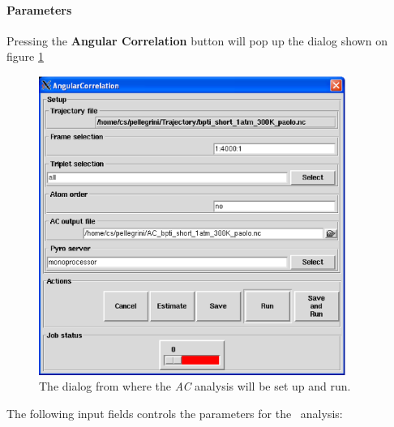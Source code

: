 \documentclass[a4paper,11pt]{report}
\begin{document}
\paragraph{Parameters\\}
\label{ac_parameters}
Pressing the \textbf{Angular Correlation} button will pop up the dialog shown on figure \ref{fig:ac}
\begin{figure}[h!]
\begin{center}
\includegraphics[width=10cm]{Figures/ac.eps}
\end{center}
\caption[The \textit{AC} analysis dialog]{The dialog from where the \textit{AC} analysis will be set up and run.}
\label{fig:ac}
\end{figure}   

The following input fields controls the parameters for the \AC\ analysis:
\end{document}
